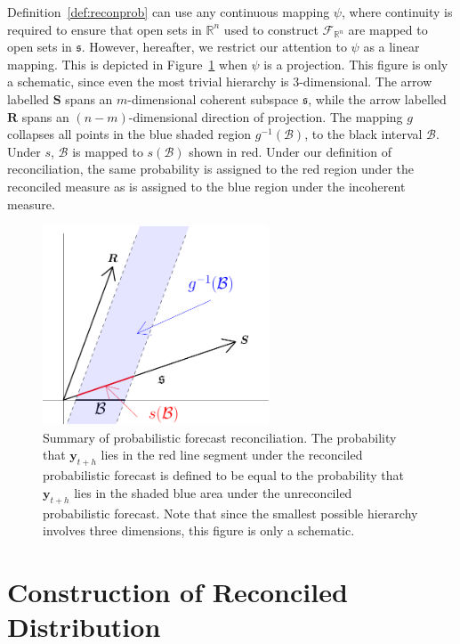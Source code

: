 \documentclass[11pt]{article}
\theoremstyle{definition}
\begin{document}
Definition~\ref{def:reconprob} can use any continuous mapping $\psi$, where continuity is required to ensure that open sets in $\mathbb{R}^n$ used to construct $\mathscr{F}_{\mathbb{R}^n}$ are mapped to open sets in $\mathfrak{s}$. However, hereafter, we restrict our attention to $\psi$ as a linear mapping. This is depicted in Figure~\ref{fig:probfr_sch} when $\psi$ is a projection. This figure is only a schematic, since even the most trivial hierarchy is $3$-dimensional. The arrow labelled $\bm{S}$ spans an $m$-dimensional coherent subspace $\mathfrak{s}$, while the arrow labelled $\bm{R}$ spans an $(n-m)$-dimensional direction of projection. The mapping $g$ collapses all points in the blue shaded region $g^{-1}(\mathcal{B})$, to the black interval $\mathcal{B}$. Under $s$, $\mathcal{B}$ is mapped to $s(\mathcal{B})$ shown in red. Under our definition of reconciliation, the same probability is assigned to the red region under the reconciled measure as is assigned to the blue region under the incoherent measure.

\begin{figure}[!htb]
	\centering \includegraphics[width=0.6\textwidth]{Figs/probforerec_schematic-crop.pdf}
	\caption{Summary of probabilistic forecast reconciliation. The probability that $\bm{y}_{t+h}$ lies in the red line segment under the reconciled probabilistic forecast is defined to be equal to the probability that $\bm{y}_{t+h}$ lies in the shaded blue area under the unreconciled probabilistic forecast. Note that since the smallest possible hierarchy involves three dimensions, this figure is only a schematic.}\label{fig:probfr_sch}
\end{figure}

\section{Construction of Reconciled Distribution} \label{sec:AnalyticalSolution}
\end{document}
